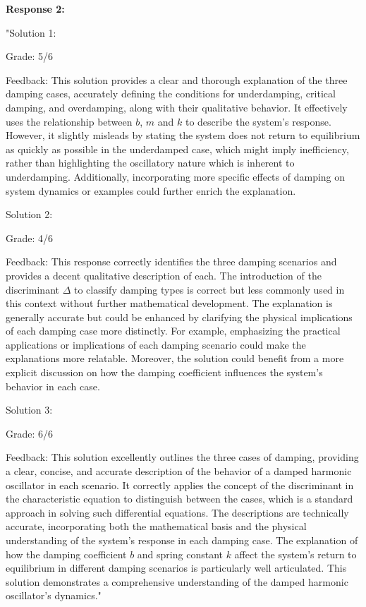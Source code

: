 \documentclass[a4paper,11pt]{article}
\begin{document}
\textbf{Response 2:}

"Solution 1:

Grade: 5/6

Feedback: This solution provides a clear and thorough explanation of the three damping cases, accurately defining the conditions for underdamping, critical damping, and overdamping, along with their qualitative behavior. It effectively uses the relationship between \(b\), \(m\) and \(k\) to describe the system's response. However, it slightly misleads by stating the system does not return to equilibrium as quickly as possible in the underdamped case, which might imply inefficiency, rather than highlighting the oscillatory nature which is inherent to underdamping. Additionally, incorporating more specific effects of damping on system dynamics or examples could further enrich the explanation.

Solution 2:

Grade: 4/6

Feedback: This response correctly identifies the three damping scenarios and provides a decent qualitative description of each. The introduction of the discriminant \(\Delta\) to classify damping types is correct but less commonly used in this context without further mathematical development. The explanation is generally accurate but could be enhanced by clarifying the physical implications of each damping case more distinctly. For example, emphasizing the practical applications or implications of each damping scenario could make the explanations more relatable. Moreover, the solution could benefit from a more explicit discussion on how the damping coefficient influences the system's behavior in each case.

Solution 3:

Grade: 6/6

Feedback: This solution excellently outlines the three cases of damping, providing a clear, concise, and accurate description of the behavior of a damped harmonic oscillator in each scenario. It correctly applies the concept of the discriminant in the characteristic equation to distinguish between the cases, which is a standard approach in solving such differential equations. The descriptions are technically accurate, incorporating both the mathematical basis and the physical understanding of the system's response in each damping case. The explanation of how the damping coefficient \(b\) and spring constant \(k\) affect the system's return to equilibrium in different damping scenarios is particularly well articulated. This solution demonstrates a comprehensive understanding of the damped harmonic oscillator's dynamics."
\end{document}
